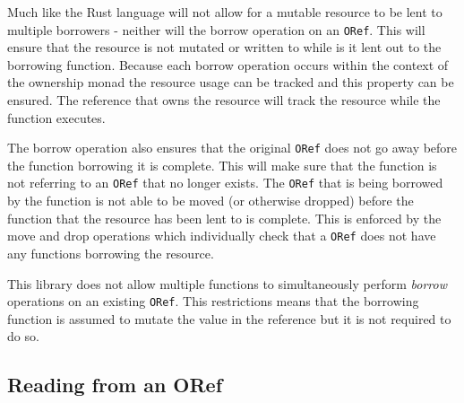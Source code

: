 \documentclass[onehalf,11pt]{beavtex}
\begin{document}
Much like the Rust language will not allow for a mutable resource to be lent to
multiple borrowers - neither will the borrow operation on an \texttt{ORef}.
This will ensure that the resource is not mutated or written to while is it lent
out to the borrowing function.
Because each borrow operation occurs within the context of the ownership monad
the resource usage can be tracked and this property can be ensured. The
reference that owns the resource will track the resource while the function
executes.

The borrow operation also ensures that the original \texttt{ORef} does not
go away before the function borrowing it is complete. This will make sure that
the function is not referring to an \texttt{ORef} that no longer exists.
The \texttt{ORef} that is being borrowed by the function is not able to be moved
(or otherwise dropped) before the function that the resource has been lent to is
complete. This is enforced by the move and drop operations which individually
check that a \texttt{ORef} does not have any functions borrowing the resource.

This library does not allow multiple functions to simultaneously perform
\textit{borrow} operations on an existing \texttt{ORef}.
This restrictions means that the borrowing function is assumed to mutate the
value in the reference but it is not required to do so.








\subsection{Reading from an ORef}
\end{document}
